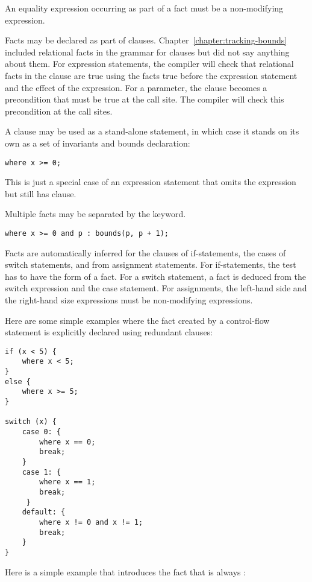 An equality expression occurring as part of a fact must be a non-modifying
expression.

Facts may be declared as part of  clauses.  
Chapter~\ref{chapter:tracking-bounds} included relational facts in
the grammar for  clauses but did not say
anything about them.  For expression statements, the compiler
will check that relational facts in the  clause are true 
using the facts true before the expression statement and the effect of
the expression. For a parameter, the  clause becomes a 
precondition that must be true at the call site. The compiler will check this
precondition at the call sites.

A  clause may be used as a stand-alone statement, 
in which case it stands on its own as a set of invariants and bounds
declaration:
\begin{lstlisting}
where x >= 0;
\end{lstlisting}
This is just a special case of an expression statement
that omits the expression but still has  clause.

Multiple facts may be separated by the  keyword.
\begin{lstlisting}
where x >= 0 and p : bounds(p, p + 1);
\end{lstlisting}

Facts are automatically inferred for the clauses of if-statements, the cases of
switch statements, and from assignment statements.  For if-statements, the test
has to have the form of a fact. For a switch statement, a fact is deduced from
the switch expression and the case statement. For assignments, the left-hand
side and the right-hand size expressions must be non-modifying expressions.

Here are some simple examples where the fact created by a control-flow
statement is explicitly declared using redundant  clauses:

\begin{lstlisting}
if (x < 5) {
    where x < 5;
}
else {
    where x >= 5;
} 

switch (x) {
    case 0: {
        where x == 0;
        break;
    }
    case 1: {
        where x == 1;
        break;
     }   
    default: {
        where x != 0 and x != 1;
        break;
    }
}
\end{lstlisting}

Here is a simple example that introduces the fact that  is always
:

